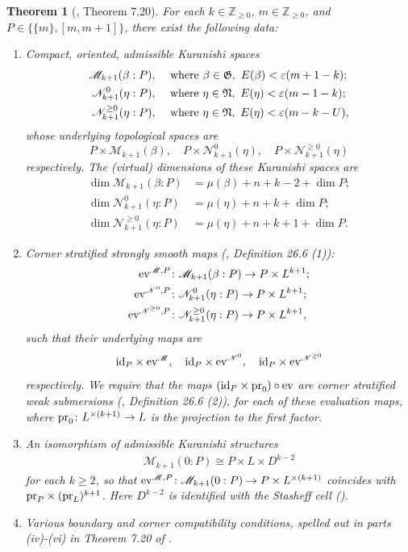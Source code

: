 \documentclass[10pt]{amsart}
\numberwithin{equation}{section}
\theoremstyle{plain}
\newtheorem{theorem}{Theorem}[section]
\theoremstyle{definition}
\theoremstyle{remark}
\numberwithin{equation}{section}
\newcommand{\Z}{\mathbb{Z}}
\newcommand{\id}{\textup{id}}
\newcommand{\ev}{\textup{ev}}
\newcommand{\ms}[1]{\mathscr{#1}}
\newcommand{\pr}{\textup{pr}}
\begin{document}
{\begin{theorem}
	[\cite{Irie2}, Theorem 7.20]\label{Thm: IrieKuranishi}
	For each $k\in \Z_{\geq 0}$, $m\in \Z_{\geq 0}$, and $P\in \{\{m\}, [m,m+1]\}$, there exist the following data:
	\begin{enumerate}
		\item Compact, oriented, admissible Kuranishi spaces \begin{align*}
			\ms{M}_{k+1}(\beta:P),\quad &\textup{ where }\beta \in \mathfrak{G}, \,\,E(\beta) < \varepsilon(m+1-k) ;\\
			 \ms{N}_{k+1}^0(\eta: P), \quad &\textup{ where }\eta \in \mathfrak{N}, \,\, E(\eta) < \varepsilon(m-1-k);\\
			 \ms{N}^{\geq 0}_{k+1}(\eta: P), \quad &\textup{ where }\eta \in \mathfrak{N}, \,\, E(\eta) < \varepsilon(m-k-U),
		\end{align*}
		whose underlying topological spaces are \[ P \times \ms{M}_{k+1}(\beta), \quad P\times \ms{N}^0_{k+1}(\eta), \quad P\times \ms{N}^{\geq 0}_{k+1}(\eta)\]respectively. The (virtual) dimensions of these Kuranishi spaces are \begin{align*}
			 \dim \ms{M}_{k+1}(\beta:P) &= \mu(\beta) + n + k - 2 + \dim P; \\
		\dim \ms{N}^0_{k+1}(\eta: P) &= \mu(\eta) + n + k + \dim P;\\
		\dim  \ms{N}^{\geq 0}_{k+1}(\eta:P) &= \mu(\eta) + n + k + 1 + \dim P.
		\end{align*}		
		\item Corner stratified strongly smooth maps (\cite{FOOO20book}, Definition 26.6 (1)):\begin{align*}
			\ev^{\ms{M},P}&\colon \ms{M}_{k+1}(\beta:P)\to P\times L^{k+1};\\
			\ev^{\ms{N}^0,P}&\colon \ms{N}^0_{k+1}(\eta:P)\to P\times L^{k+1};\\
			\ev^{\ms{N}^{\geq 0},P}&\colon \ms{N}^{\geq 0}_{k+1}(\eta:P)\to P\times L^{k+1},
		\end{align*}
		such that their underlying maps are \[ \id_P\times \ev^\ms{M},\quad \id_P \times \ev^{\ms{N}^0},\quad \id_P\times \ev^{\ms{N}^{\geq 0}} \]respectively. We require that the maps $(\id_P\times \pr_0)\circ \ev$ are corner stratified weak submersions (\cite{FOOO20book}, Definition 26.6 (2)), for each of these evaluation maps, where $\pr_0\colon L^{\times (k+1)}\to L$ is the projection to the first factor.
		\item An isomorphism of admissible Kuranishi structures \begin{align}\label{Eq: EnergyZeroKura}
			\ms{M}_{k+1}(0:P)\cong P\times L \times D^{k-2} 
		\end{align}for each $k\geq 2$, so that $\ev^{\ms{M},P}\colon \ms{M}_{k+1}(0:P)\to P\times L^{\times(k+1)}$ coincides with $\pr_P\times (\pr_L)^{k+1}$. Here $D^{k-2}$ is identified with the Stasheff cell (\cite{FukayaOh}). 
		\item Various boundary and corner compatibility conditions, spelled out in parts (iv)-(vi) in Theorem 7.20 of \cite{Irie2}.
	\end{enumerate}
\end{theorem}

}
\end{document}
